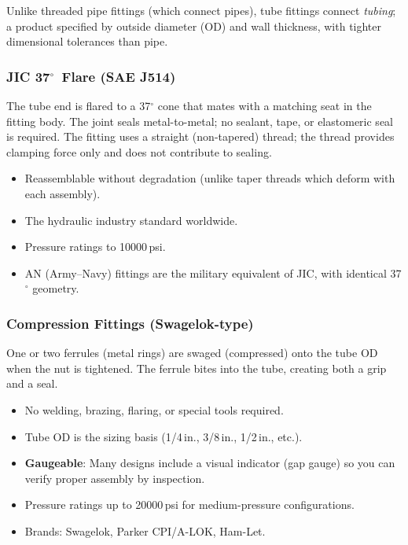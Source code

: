 \documentclass[11pt,letterpaper,twoside,openany]{book}
\providecommand{\ang}[1]{#1\ensuremath{{}^{\circ}}}
\begin{document}
Unlike threaded pipe fittings (which connect pipes), tube fittings connect \emph{tubing}; a product specified by outside diameter (OD) and wall thickness, with tighter dimensional tolerances than pipe.

\subsubsection{JIC 37$^{\circ}$\ Flare (SAE J514)}

The tube end is flared to a \ang{37} cone that mates with a matching seat in the fitting body. The joint seals metal-to-metal; no sealant, tape, or elastomeric seal is required. The fitting uses a straight (non-tapered) thread; the thread provides clamping force only and does not contribute to sealing.

\begin{itemize}[nosep,leftmargin=1.5em]
  \item Reassemblable without degradation (unlike taper threads which deform with each assembly).
  \item The hydraulic industry standard worldwide.
  \item Pressure ratings to 10000\,psi.
  \item AN (Army--Navy) fittings are the military equivalent of JIC, with identical \ang{37} geometry.
\end{itemize}

\subsubsection{Compression Fittings (Swagelok-type)}

One or two ferrules (metal rings) are swaged (compressed) onto the tube OD when the nut is tightened. The ferrule bites into the tube, creating both a grip and a seal.

\begin{itemize}[nosep,leftmargin=1.5em]
  \item No welding, brazing, flaring, or special tools required.
  \item Tube OD is the sizing basis (1/4\,in., 3/8\,in., 1/2\,in., etc.).
  \item \textbf{Gaugeable}: Many designs include a visual indicator (gap gauge) so you can verify proper assembly by inspection.
  \item Pressure ratings up to 20000\,psi for medium-pressure configurations.
  \item Brands: Swagelok, Parker CPI/A-LOK, Ham-Let.
\end{itemize}
\end{document}
